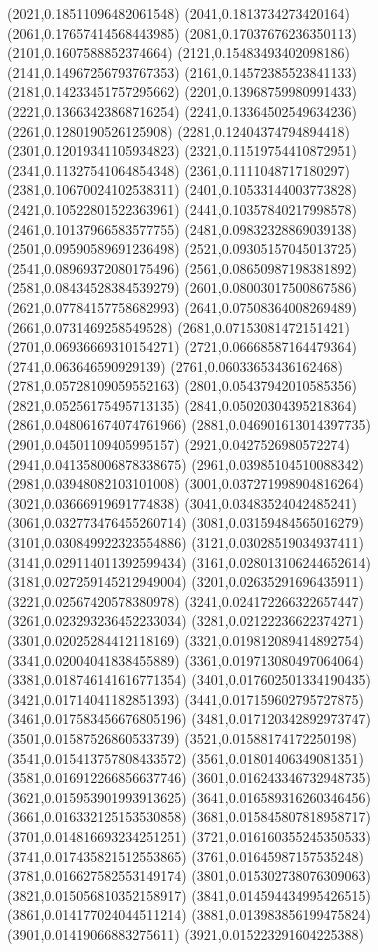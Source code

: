 {(2021,0.18511096482061548)
(2041,0.1813734273420164)
(2061,0.17657414568443985)
(2081,0.17037676236350113)
(2101,0.1607588852374664)
(2121,0.15483493402098186)
(2141,0.14967256793767353)
(2161,0.14572385523841133)
(2181,0.14233451757295662)
(2201,0.13968759980991433)
(2221,0.13663423868716254)
(2241,0.13364502549634236)
(2261,0.1280190526125908)
(2281,0.12404374794894418)
(2301,0.12019341105934823)
(2321,0.11519754410872951)
(2341,0.11327541064854348)
(2361,0.1111048717180297)
(2381,0.10670024102538311)
(2401,0.10533144003773828)
(2421,0.10522801522363961)
(2441,0.10357840217998578)
(2461,0.10137966583577755)
(2481,0.09832328869039138)
(2501,0.09590589691236498)
(2521,0.09305157045013725)
(2541,0.08969372080175496)
(2561,0.08650987198381892)
(2581,0.08434528384539279)
(2601,0.08003017500867586)
(2621,0.07784157758682993)
(2641,0.07508364008269489)
(2661,0.0731469258549528)
(2681,0.07153081472151421)
(2701,0.06936669310154271)
(2721,0.06668587164479364)
(2741,0.063646590929139)
(2761,0.06033653436162468)
(2781,0.05728109059552163)
(2801,0.05437942010585356)
(2821,0.05256175495713135)
(2841,0.05020304395218364)
(2861,0.048061674074761966)
(2881,0.046901613014397735)
(2901,0.04501109405995157)
(2921,0.0427526980572274)
(2941,0.041358006878338675)
(2961,0.03985104510088342)
(2981,0.03948082103101008)
(3001,0.037271998904816264)
(3021,0.03666919691774838)
(3041,0.03483524042485241)
(3061,0.032773476455260714)
(3081,0.03159484565016279)
(3101,0.030849922323554886)
(3121,0.03028519034937411)
(3141,0.029114011392599434)
(3161,0.028013106244652614)
(3181,0.027259145212949004)
(3201,0.02635291696435911)
(3221,0.02567420578380978)
(3241,0.024172266322657447)
(3261,0.023293236452233034)
(3281,0.02122236622374271)
(3301,0.02025284412118169)
(3321,0.019812089414892754)
(3341,0.02004041838455889)
(3361,0.019713080497064064)
(3381,0.018746141616771354)
(3401,0.017602501334190435)
(3421,0.01714041182851393)
(3441,0.017159602795727875)
(3461,0.017583456676805196)
(3481,0.017120342892973747)
(3501,0.01587526860533739)
(3521,0.01588174172250198)
(3541,0.015413757808433572)
(3561,0.01801406349081351)
(3581,0.016912266856637746)
(3601,0.016243346732948735)
(3621,0.015953901993913625)
(3641,0.016589316260346456)
(3661,0.016332125153530858)
(3681,0.015845807818958717)
(3701,0.014816693234251251)
(3721,0.016160355245350533)
(3741,0.017435821512553865)
(3761,0.01645987157535248)
(3781,0.016627582553149174)
(3801,0.015302738076309063)
(3821,0.015056810352158917)
(3841,0.014594434995426515)
(3861,0.014177024044511214)
(3881,0.013983856199475824)
(3901,0.01419066883275611)
(3921,0.015223291604225388)
}
